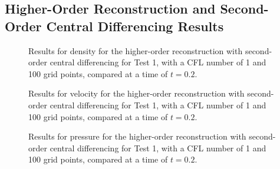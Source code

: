 \subsection{Higher-Order Reconstruction and Second-Order Central Differencing Results}
\begin{figure}
	\caption[Results for density for the higher-order reconstruction with second-order central differencing for Test 1, with a CFL number of 1 and 100 grid points, compared at a time of $t=0.2$.]{Results for density for the higher-order reconstruction with second-order central differencing for Test 1, with a CFL number of 1 and 100 grid points, compared at a time of $t=0.2$.}
	\label{fig:Test1HORCD2density}
\end{figure}

\begin{figure}
	\caption[Results for velocity for the higher-order reconstruction with second-order central differencing for Test 1, with a CFL number of 1 and 100 grid points, compared at a time of $t=0.2$.]{Results for velocity for the higher-order reconstruction with second-order central differencing for Test 1, with a CFL number of 1 and 100 grid points, compared at a time of $t=0.2$.}
	\label{fig:Test1HORCD2velocity}
\end{figure}

\begin{figure}
	\caption[Results for pressure for the higher-order reconstruction with second-order central differencing for Test 1, with a CFL number of 1 and 100 grid points, compared at a time of $t=0.2$.]{Results for pressure for the higher-order reconstruction with second-order central differencing for Test 1, with a CFL number of 1 and 100 grid points, compared at a time of $t=0.2$.}
	\label{fig:Test1HORCD2pressure}
\end{figure}

